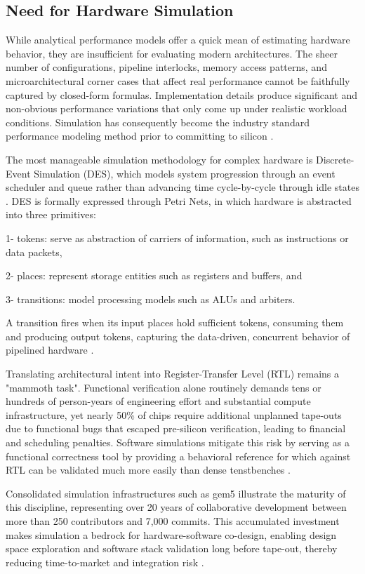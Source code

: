 \subsection{Need for Hardware Simulation}

While analytical performance models offer a quick mean of estimating hardware behavior, they are insufficient for evaluating modern architectures. The sheer number of configurations, pipeline interlocks, memory access patterns, and microarchitectural corner cases that affect real performance cannot be faithfully captured by closed-form formulas. Implementation details produce significant and non-obvious performance variations that only come up under realistic workload conditions. Simulation has consequently become the industry standard performance modeling method prior to committing to silicon \cite{surveycomparchsim}.

The most manageable simulation methodology for complex hardware is Discrete-Event Simulation (DES), which models system progression through an event scheduler and queue rather than advancing time cycle-by-cycle through idle states \cite{surveycomparchsim}. DES is formally expressed through Petri Nets, in which hardware is abstracted into three primitives:

1- tokens: serve as abstraction of carriers of information, such as instructions or data packets,

2- places: represent storage entities such as registers and buffers, and

3- transitions: model processing models such as ALUs and arbiters.

A transition fires when its input places hold sufficient tokens, consuming them and producing output tokens, capturing the data-driven, concurrent behavior of pipelined hardware \cite{casvliw}.

Translating architectural intent into Register-Transfer Level (RTL) remains a "mammoth task". Functional verification alone routinely demands tens or hundreds of person-years of engineering effort and substantial compute infrastructure, yet nearly 50\% of chips require additional unplanned tape-outs due to functional bugs that escaped pre-silicon verification, leading to financial and scheduling penalties. Software simulations mitigate this risk by serving as a functional correctness tool by providing a behavioral reference for which against RTL can be validated much more easily than dense tenstbenches \cite{unifiedmethpresiverif}.

Consolidated simulation infrastructures such as gem5 illustrate the maturity of this discipline, representing over 20 years of collaborative development between more than 250 contributors and 7,000 commits. This accumulated investment makes simulation a bedrock for hardware-software co-design, enabling design space exploration and software stack validation long before tape-out, thereby reducing time-to-market and integration risk \cite{gem5}.